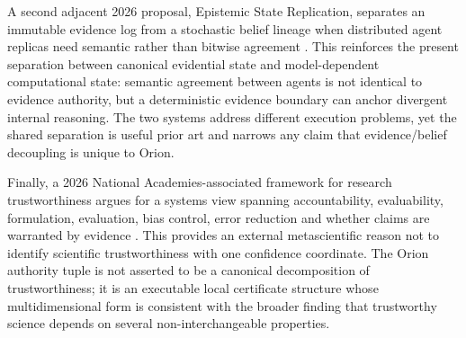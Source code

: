 A second adjacent 2026 proposal, Epistemic State Replication, separates an immutable evidence log from a stochastic belief lineage when distributed agent replicas need semantic rather than bitwise agreement \cite{heyu2026esr}. This reinforces the present separation between canonical evidential state and model-dependent computational state: semantic agreement between agents is not identical to evidence authority, but a deterministic evidence boundary can anchor divergent internal reasoning. The two systems address different execution problems, yet the shared separation is useful prior art and narrows any claim that evidence/belief decoupling is unique to Orion.

Finally, a 2026 National Academies-associated framework for research trustworthiness argues for a systems view spanning accountability, evaluability, formulation, evaluation, bias control, error reduction and whether claims are warranted by evidence \cite{nosek2026trust}. This provides an external metascientific reason not to identify scientific trustworthiness with one confidence coordinate. The Orion authority tuple is not asserted to be a canonical decomposition of trustworthiness; it is an executable local certificate structure whose multidimensional form is consistent with the broader finding that trustworthy science depends on several non-interchangeable properties.
